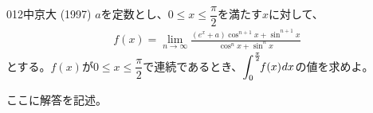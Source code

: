 \begin{prob}{012}{}{中京大 (1997)}
 $a$を定数とし、$0\le x \le \dfrac{\pi}{2}$を満たす$x$に対して、
 \begin{align*}
  f(x)=\lim_{n\rightarrow\infty}\frac{(e^x+a)\cos^{n+1}x+\sin^{n+1}x}{\cos^nx+\sin^nx}
 \end{align*}
 とする。$f(x)$が$0\le x \le \dfrac{\pi}{2}$で連続であるとき、$\displaystyle \int^{\frac{\pi}{2}}_0\!\! f(x) \hspace{0.1ex}dx$の値を求めよ。
\end{prob}
ここに解答を記述。